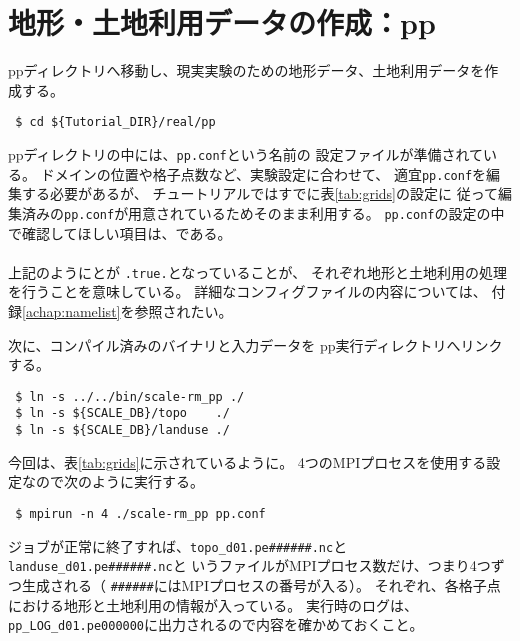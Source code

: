 \section{地形・土地利用データの作成：pp} \label{sec:tutrial_real_pp}

ppディレクトリへ移動し、現実実験のための地形データ、土地利用データを作成する。
\begin{verbatim}
 $ cd ${Tutorial_DIR}/real/pp
\end{verbatim}
ppディレクトリの中には、\verb|pp.conf|という名前の
設定ファイルが準備されている。
ドメインの位置や格子点数など、実験設定に合わせて、
適宜\verb|pp.conf|を編集する必要があるが、
チュートリアルではすでに表\ref{tab:grids}の設定に
従って編集済みの\verb|pp.conf|が用意されているためそのまま利用する。
\verb|pp.conf|の設定の中で確認してほしい項目は、である。\\

\\

\noindent 上記のようにとが
\verb|.true.|となっていることが、
それぞれ地形と土地利用の処理を行うことを意味している。
詳細なコンフィグファイルの内容については、
付録\ref{achap:namelist}を参照されたい。

次に、コンパイル済みのバイナリと入力データを
pp実行ディレクトリへリンクする。
\begin{verbatim}
 $ ln -s ../../bin/scale-rm_pp ./
 $ ln -s ${SCALE_DB}/topo    ./
 $ ln -s ${SCALE_DB}/landuse ./
\end{verbatim}
今回は、表\ref{tab:grids}に示されているように。
4つのMPIプロセスを使用する設定なので次のように実行する。
\begin{verbatim}
 $ mpirun -n 4 ./scale-rm_pp pp.conf
\end{verbatim}
ジョブが正常に終了すれば、\verb|topo_d01.pe######.nc|と\\
\verb|landuse_d01.pe######.nc|と
いうファイルがMPIプロセス数だけ、つまり4つずつ生成される（
\verb|######|にはMPIプロセスの番号が入る）。
それぞれ、各格子点における地形と土地利用の情報が入っている。
実行時のログは、\verb|pp_LOG_d01.pe000000|に出力されるので内容を確かめておくこと。


